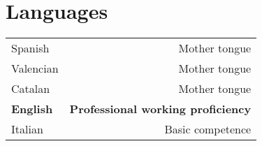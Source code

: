 \documentclass[10pt]{article}
\begin{document}
\section*{Languages}
\begin{tabular}{L!{\VRule}R}
Spanish&Mother tongue\\
Valencian&Mother tongue\\
Catalan&Mother tongue\\
{\bf English}&{\bf Professional working proficiency}\\
Italian&Basic competence\\
\end{tabular}

\end{document}
